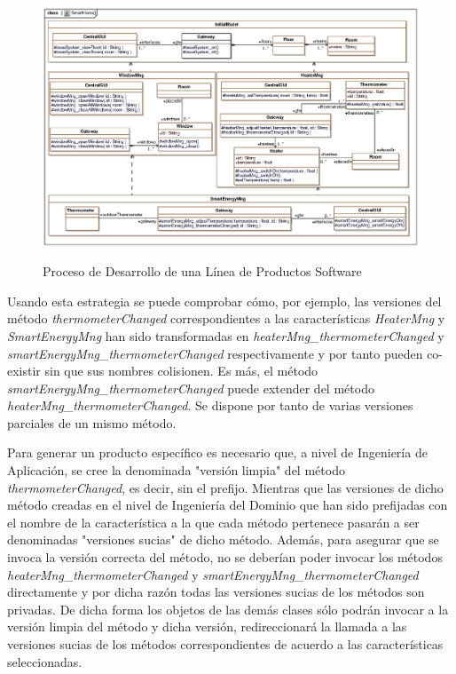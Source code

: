 \begin{figure}[!tb]
  \centering
	\includegraphics[width=.95\linewidth]{background/images/slicerPattern.eps} \\
  \caption{Proceso de Desarrollo de una Línea de Productos Software}
  \label{back:fig:slicerPattern}
\end{figure}

Usando esta estrategia se puede comprobar cómo, por ejemplo, las versiones del método \emph{thermometerChanged} correspondientes a las características \emph{HeaterMng} y \emph{SmartEnergyMng} han sido transformadas en \emph{heaterMng_thermometerChanged} y \emph{smartEnergyMng_thermometerChanged} respectivamente y por tanto pueden co-existir sin que sus nombres colisionen. Es más, el método \emph{smartEnergyMng_thermometerChanged} puede extender del método \emph{heaterMng_thermometerChanged}. Se dispone por tanto de varias versiones parciales de un mismo método.

Para generar un producto específico es necesario que, a nivel de Ingeniería de Aplicación, se cree la denominada "versión limpia" del método \emph{thermometerChanged}, es decir, sin el prefijo. Mientras que las versiones de dicho método creadas en el nivel de Ingeniería del Dominio que han sido prefijadas con el nombre de la característica a la que cada método pertenece pasarán a ser denominadas "versiones sucias" de dicho método. Además, para asegurar que se invoca la versión correcta del método, no se deberían poder invocar los métodos \emph{heaterMng_thermometerChanged} y \emph{smartEnergyMng_thermometerChanged} directamente y por dicha razón todas las versiones sucias de los métodos son privadas. De dicha forma los objetos de las demás clases sólo podrán invocar a la versión limpia del método y dicha versión, redireccionará la llamada a las versiones sucias de los métodos correspondientes de acuerdo a las características seleccionadas.

